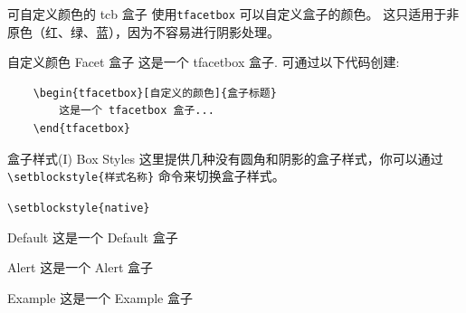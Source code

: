 \documentclass[10pt,aspectratio=169,fontset=none]{ctexbeamer}
\begin{document}
    \begin{frame}[fragile]{可自定义颜色的 tcb 盒子 }
        使用\texttt{tfacetbox} 可以自定义盒子的颜色。 这只适用于非原色（红、绿、蓝），因为不容易进行阴影处理。
        \begin{tfacetbox}[nudarkyellow]{自定义颜色 Facet 盒子}
            这是一个 tfacetbox 盒子. 可通过以下代码创建:
            \begin{verbatim}
    \begin{tfacetbox}[自定义的颜色]{盒子标题}
        这是一个 tfacetbox 盒子...
    \end{tfacetbox}
            \end{verbatim}
        \end{tfacetbox}
    \end{frame}

    \begin{frame}{盒子样式(I) Box Styles}
        这里提供几种没有圆角和阴影的盒子样式，你可以通过 \texttt{\textcolor{primary}{\textbackslash setblockstyle}\{样式名称\}} 命令来切换盒子样式。

        \begin{center}
            \texttt{\textcolor{primary}{\textbackslash setblockstyle}\{native\}}
        \end{center}

        \centering
        \begin{minipage}[b]{0.5\textwidth}
            \begin{block}{Default}
                这是一个 Default 盒子
            \end{block}
            \begin{alertblock}{Alert}
                这是一个 Alert 盒子
            \end{alertblock}
            \begin{exampleblock}{Example}
                这是一个 Example 盒子
            \end{exampleblock} 
        \end{minipage}

    \end{frame}
\end{document}
